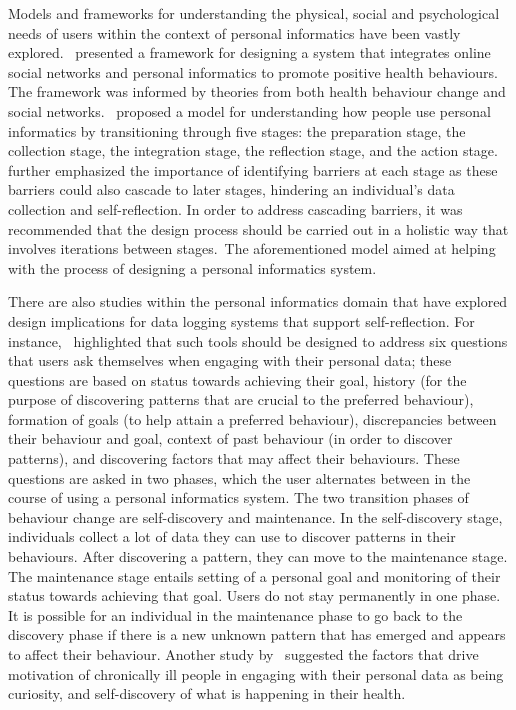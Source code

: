 Models and frameworks for understanding the physical, social and psychological needs of users within the context of personal informatics have been vastly explored.~\cite{kamal2010understanding} presented a framework for designing a system that integrates online social networks and personal informatics to promote positive health behaviours. The framework was informed by theories from both health behaviour change and social networks.~\cite{li2010stage} proposed a model for understanding how people use personal informatics by transitioning through five stages: the preparation stage, the collection stage, the integration stage, the reflection stage, and the action stage. \cite{li2010stage} further emphasized the importance of identifying barriers at each stage as these barriers could also cascade to later stages, hindering an individual’s data collection and self-reflection. In order to address cascading barriers, it was recommended that the design process should be carried out in a holistic way that involves iterations between stages.~The aforementioned model aimed at helping with the process of designing a personal informatics system.

There are also studies within the personal informatics domain that have explored design implications for data logging systems that support self-reflection. For instance,~\cite{li2011understanding} highlighted that such tools should be designed to address six questions that users ask themselves when engaging with their personal data; these questions are based on status towards achieving their goal, history (for the purpose of discovering patterns that are crucial to the preferred behaviour), formation of goals (to help attain a preferred behaviour), discrepancies between their behaviour and goal, context of past behaviour (in order to discover patterns), and discovering factors that may affect their behaviours. These questions are asked in two phases, which the user alternates between in the course of using a personal informatics system. The two transition phases of behaviour change are self-discovery and maintenance. In the self-discovery stage, individuals collect a lot of data they can use to discover patterns in their behaviours. After discovering a pattern, they can move to the maintenance stage. The maintenance stage entails setting of a personal goal and monitoring of their status towards achieving that goal. Users do not stay permanently in one phase. It is possible for an individual in the maintenance phase to go back to the discovery phase if there is a new unknown pattern that has emerged and appears to affect their behaviour. Another study by~\cite{macleod2013personal} suggested the factors that drive motivation of chronically ill people in engaging with their personal data as being curiosity, and self-discovery of what is happening in their health.

